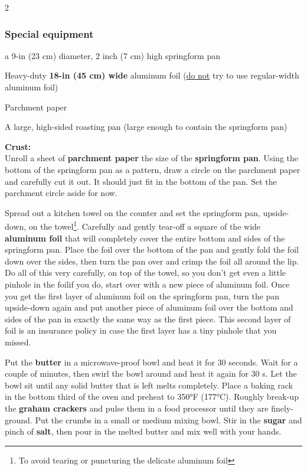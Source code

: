 \begin{multicols}{2}
	\subsubsection*{Special equipment}
	\begin{ingredients}
		\item a 9-in (23 cm) diameter, 2 inch (7 cm) high springform pan
		\item Heavy-duty \textbf{18-in (45 cm) wide} aluminum foil (\underline{do not} try to use regular-width aluminum foil)
		\item Parchment paper
		\item A large, high-sided roasting pan (large enough to contain the springform pan)
	\end{ingredients}
	
\end{multicols}

\medskip

\noindent \textbf{Crust:} \\ 
Unroll a sheet of \textbf{parchment paper} the size of the \textbf{springform pan}. 
Using the bottom of the springform pan as a pattern, draw a circle on the parchment paper and carefully cut it out. 
It should just fit in the bottom of the pan. 
Set the parchment circle aside for now.

Spread out a kitchen towel on the counter and set the springform pan, upside-down, on the towel\footnote{To avoid tearing or puncturing the delicate aluminum foil}.
Carefully and gently tear-off a square of the wide \textbf{aluminum foil} that will completely cover the entire bottom and sides of the springform pan. 
Place the foil over the bottom of the pan and gently fold the foil down over the sides, then turn the pan over and crimp the foil all around the lip. 
Do all of this very carefully, on top of the towel, so you don’t get even a little pinhole in the foil\textemdash if you do, start over with a new piece of aluminum foil. 
Once you get the first layer of aluminum foil on the springform pan, turn the pan upside-down again and put another piece of aluminum foil over the bottom and sides of the pan in exactly the same way as the first piece. 
This second layer of foil is an insurance policy in case the first layer has a tiny pinhole that you missed.

Put the \textbf{butter} in a microwave-proof bowl and heat it for 30 seconds. 
Wait for a couple of minutes, then swirl the bowl around and heat it again for 30 s. 
Let the bowl sit until any solid butter that is left melts completely.
Place a baking rack in the bottom third of the oven and preheat to 350°F (177°C). 
Roughly break-up the \textbf{graham crackers} and pulse them in a food processor until they are finely-ground. 
Put the crumbs in a small or medium mixing bowl. 
Stir in the \textbf{sugar} and pinch of \textbf{salt}, then pour in the melted butter and mix well with your hands.

